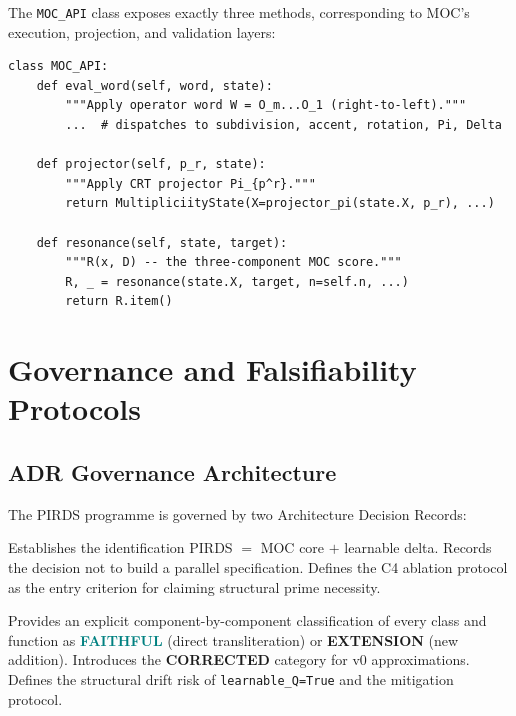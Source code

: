 \documentclass[11pt,a4paper]{article}
\theoremstyle{plain}
\theoremstyle{definition}
\theoremstyle{remark}
\newcommand{\faithful}{\textcolor{teal}{\textbf{FAITHFUL}}}
\newcommand{\extension}{\textcolor{rust}{\textbf{EXTENSION}}}
\newcommand{\corrected}{\textcolor{muted}{\textbf{CORRECTED}}}
\begin{document}
The \texttt{MOC\_API} class exposes exactly three methods, corresponding to MOC's
execution, projection, and validation layers:

\begin{lstlisting}[caption={MOC\_API: the Phase Mirror interface},label=lst:api]
class MOC_API:
    def eval_word(self, word, state):
        """Apply operator word W = O_m...O_1 (right-to-left)."""
        ...  # dispatches to subdivision, accent, rotation, Pi, Delta

    def projector(self, p_r, state):
        """Apply CRT projector Pi_{p^r}."""
        return MultipliciityState(X=projector_pi(state.X, p_r), ...)

    def resonance(self, state, target):
        """R(x, D) -- the three-component MOC score."""
        R, _ = resonance(state.X, target, n=self.n, ...)
        return R.item()
\end{lstlisting}

\section{Governance and Falsifiability Protocols}
\label{sec:governance}

\subsection{ADR Governance Architecture}

The PIRDS programme is governed by two Architecture Decision Records:

\begin{description}[leftmargin=1.5em,itemsep=4pt]
  \item[ADR-001] Establishes the identification PIRDS $=$ MOC core $+$ learnable delta.
    Records the decision not to build a parallel specification. Defines the C4 ablation
    protocol as the entry criterion for claiming structural prime necessity.
  \item[ADR-002] Provides an explicit component-by-component classification of every
    class and function as \faithful{} (direct transliteration) or \extension{} (new addition).
    Introduces the \corrected{} category for v0 approximations. Defines the structural drift
    risk of \texttt{learnable\_Q=True} and the mitigation protocol.
\end{description}
\end{document}
